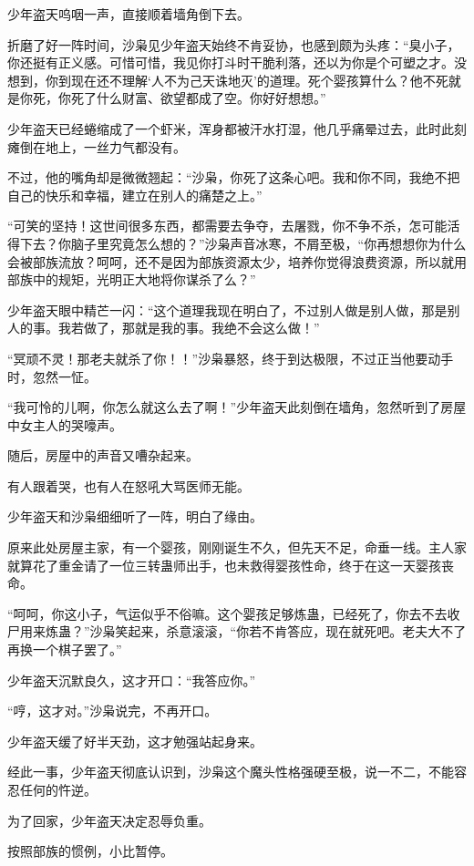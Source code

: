 \begin{this_body}
少年盗天呜咽一声，直接顺着墙角倒下去。

折磨了好一阵时间，沙枭见少年盗天始终不肯妥协，也感到颇为头疼：“臭小子，你还挺有正义感。可惜可惜，我见你打斗时干脆利落，还以为你是个可塑之才。没想到，你到现在还不理解‘人不为己天诛地灭’的道理。死个婴孩算什么？他不死就是你死，你死了什么财富、欲望都成了空。你好好想想。”

少年盗天已经蜷缩成了一个虾米，浑身都被汗水打湿，他几乎痛晕过去，此时此刻瘫倒在地上，一丝力气都没有。

不过，他的嘴角却是微微翘起：“沙枭，你死了这条心吧。我和你不同，我绝不把自己的快乐和幸福，建立在别人的痛楚之上。”

“可笑的坚持！这世间很多东西，都需要去争夺，去屠戮，你不争不杀，怎可能活得下去？你脑子里究竟怎么想的？”沙枭声音冰寒，不屑至极，“你再想想你为什么会被部族流放？呵呵，还不是因为部族资源太少，培养你觉得浪费资源，所以就用部族中的规矩，光明正大地将你谋杀了么？”

少年盗天眼中精芒一闪：“这个道理我现在明白了，不过别人做是别人做，那是别人的事。我若做了，那就是我的事。我绝不会这么做！”

“冥顽不灵！那老夫就杀了你！！”沙枭暴怒，终于到达极限，不过正当他要动手时，忽然一怔。

“我可怜的儿啊，你怎么就这么去了啊！”少年盗天此刻倒在墙角，忽然听到了房屋中女主人的哭嚎声。

随后，房屋中的声音又嘈杂起来。

有人跟着哭，也有人在怒吼大骂医师无能。

少年盗天和沙枭细细听了一阵，明白了缘由。

原来此处房屋主家，有一个婴孩，刚刚诞生不久，但先天不足，命垂一线。主人家就算花了重金请了一位三转蛊师出手，也未救得婴孩性命，终于在这一天婴孩丧命。

“呵呵，你这小子，气运似乎不俗嘛。这个婴孩足够炼蛊，已经死了，你去不去收尸用来炼蛊？”沙枭笑起来，杀意滚滚，“你若不肯答应，现在就死吧。老夫大不了再换一个棋子罢了。”

少年盗天沉默良久，这才开口：“我答应你。”

“哼，这才对。”沙枭说完，不再开口。

少年盗天缓了好半天劲，这才勉强站起身来。

经此一事，少年盗天彻底认识到，沙枭这个魔头性格强硬至极，说一不二，不能容忍任何的忤逆。

为了回家，少年盗天决定忍辱负重。

按照部族的惯例，小比暂停。


\end{this_body}
